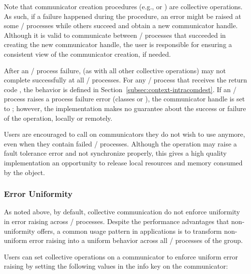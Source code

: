 \begin{users}

Note that communicator creation procedures (e.g.,  or
) are collective operations. As such, if a failure
happened during the procedure, an error might be raised at some \MPI/ processes while
others succeed and obtain a new communicator handle.  Although it is valid to communicate
between \MPI/ processes that succeeded in creating the new communicator handle, the user is
responsible for ensuring a consistent view of the communicator creation, if needed.
\end{users}

\par After an \MPI/ process failure,  (as with all
other collective operations) may not complete successfully at all
\MPI/ processes. For any \MPI/ process that receives the return code
, the behavior is defined in
Section~\ref{subsec:context-intracomdest}. If an \MPI/ process raises a process
failure error (classes  or
), the communicator handle  is
set to ; however, the implementation makes no
guarantee about the success or failure of the
 operation, locally or remotely.

\begin{users} Users are encouraged to call 
    on communicators they do not wish to use anymore, even when they
    contain failed \MPI/ processes. Although the operation may raise a
    fault tolerance error and not synchronize properly, this
    gives a high quality implementation an opportunity to release
    local resources and memory consumed by the object.
\end{users}

\subsubsection{Error Uniformity}

As noted above, by default, collective communication do not enforce uniformity
in error raising across \MPI/ processes. Despite the performance advantages that
non-uniformity offers, a common usage pattern in applications is
to transform non-uniform error raising into a uniform behavior across all
\MPI/ processes of the group.

Users can set collective operations on a communicator to enforce uniform error
raising by setting the following values in the info key  on the communicator:

